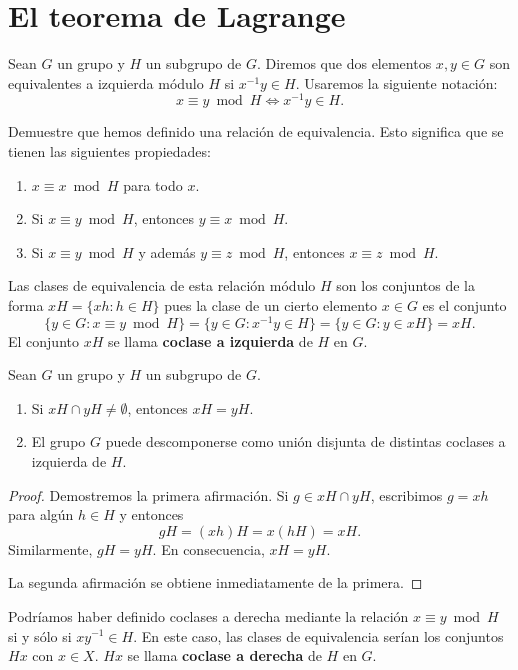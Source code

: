 \chapter{El teorema de Lagrange}

Sean $G$ un grupo y $H$ un subgrupo de $G$. Diremos que dos elementos $x,y\in
G$ son equivalentes a izquierda módulo $H$ si $x^{-1}y\in H$.  
Usaremos la siguiente notación:
\[
x\equiv y\bmod
H\Longleftrightarrow x^{-1}y\in H.
\]  

\begin{exercise}
	Demuestre que hemos definido una relación de equivalencia. 
	Esto significa que se tienen las siguientes propiedades:
	\begin{enumerate}
	\item $x\equiv x\bmod H$ para todo $x$.
	\item Si $x\equiv y\bmod H$, entonces $y\equiv x\bmod H$.
	\item Si $x\equiv y\bmod H$ y además $y\equiv z\bmod H$, entonces $x\equiv z\bmod H$.  	
	\end{enumerate}
\end{exercise}

Las clases de equivalencia de esta relación módulo $H$ 
son los conjuntos de la forma $xH=\{xh:h\in H\}$
pues la clase de un cierto elemento $x\in G$ es el conjunto
\[
	\{y\in G:x\equiv y\bmod H\}=\{y\in G:x^{-1}y\in H\}=\{y\in G:y\in xH\}=xH.
\]
El conjunto $xH$ se 
llama \textbf{coclase a izquierda} de $H$ en $G$. 

\begin{proposition}
Sean $G$ un grupo y $H$ un subgrupo de $G$.  
\begin{enumerate}
\item Si $xH\cap yH\ne\emptyset$, entonces $xH=yH$. 	
\item El grupo $G$ puede descomponerse como unión disjunta
de distintas coclases a izquierda de $H$. 
\end{enumerate}
\end{proposition}

\begin{proof}
Demostremos la primera afirmación. 
Si $g\in xH\cap yH$, escribimos
$g=xh$ para algún $h\in H$ y entonces
\[
gH=(xh)H=x(hH)=xH.
\]
Similarmente, $gH=yH$. En consecuencia, $xH=yH$.

La segunda afirmación se obtiene inmediatamente de la primera.  
\end{proof}

Podríamos haber definido coclases a derecha mediante la relación $x\equiv
y\bmod H$ si y sólo si $xy^{-1}\in H$. En este caso, las clases de equivalencia
serían los conjuntos $Hx$ con $x\in X$. $Hx$ se llama \textbf{coclase a derecha}
de $H$ en $G$. 

